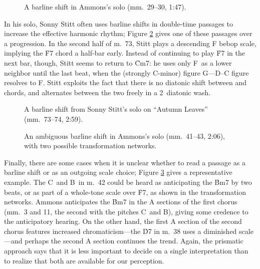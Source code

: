 \begin{figure}[tbp]
  \caption[A barline shift from Ammons's solo.]{A barline shift in Ammons's
    solo (mm.~29--30, 1:47).}
  \label{csa:metric-delay}
\end{figure}

In his solo, Sonny Stitt often uses barline shifts in double-time passages to
increase the effective harmonic rhythm; Figure \ref{csa:stitt-double-time}
gives one of these passages over a \tf progression. In the second
half of m.~73, Stitt plays a descending F bebop scale, implying the \h{F7}
chord a half-bar early. Instead of continuing to play \h{F7} in the
next bar, though, Stitt seems to return to \h{Cm7}: he uses only F\sharp\ as a
lower neighbor until the last beat, when the (strongly C-minor) figure
G--\Eflat--D--C figure resolves to F\nat. Stitt exploits the fact that there
is no diatonic shift between \ii and \V chords, and alternates between the
two freely in a 2\flat\ diatonic wash.

\begin{figure}[tbp]
  \caption[A barline shift from Sonny Stitt's solo on ``Autumn Leaves.'']{A
    barline shift from Sonny Stitt's solo on ``Autumn Leaves'' (mm.~73--74,
    2:59).}
  \label{csa:stitt-double-time}
\end{figure}

\begin{figure}[tbp]
  \caption[An ambiguous barline shift in Ammons's solo, with two possible
  transformation networks.]{An ambiguous barline shift in Ammons's
  solo (mm.~41--43, 2:06), with two possible transformation networks.}
  \label{csa:metric-parsing}
\end{figure}

Finally, there are some cases when it is unclear whether to read a passage as
a barline shift or as an outgoing scale choice; Figure
\ref{csa:metric-parsing} gives a representative example. The
C\sharp\ and B\nat\ in m.~42 could be heard as anticipating the \h{Bm7} by two
beats, or as part of a whole-tone scale over \h{F7}, as shown in the
transformation networks. Ammons anticipates the \h{Bm7} in the A sections of
the first chorus (mm.~3 and 11, the second with the pitches C\sharp\ and
B\nat), giving some credence to the anticipatory hearing. On the other hand,
the first A section of the second chorus features increased chromaticism---the
\h{D7} in m.~38 uses a diminished scale---and perhaps the second A section
continues the trend. Again, the prismatic approach says that it is less
important to decide on a single interpretation than to realize that both
are available for our perception.

